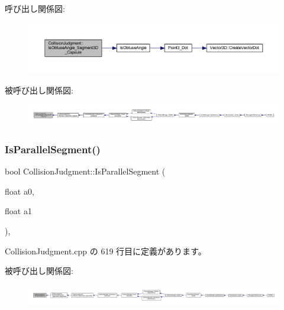 呼び出し関係図\+:\nopagebreak
\begin{figure}[H]
\begin{center}
\leavevmode
\includegraphics[width=350pt]{class_collision_judgment_a58785d1cd51b4d7af4c19dca42d842e5_cgraph}
\end{center}
\end{figure}
被呼び出し関係図\+:
\nopagebreak
\begin{figure}[H]
\begin{center}
\leavevmode
\includegraphics[width=350pt]{class_collision_judgment_a58785d1cd51b4d7af4c19dca42d842e5_icgraph}
\end{center}
\end{figure}
\mbox{\label{class_collision_judgment_a5176f1eb6b0a2fd70efc0c08054064d0}} 
\subsubsection{\texorpdfstring{Is\+Parallel\+Segment()}{IsParallelSegment()}}
{\footnotesize\ttfamily bool Collision\+Judgment\+::\+Is\+Parallel\+Segment (\begin{DoxyParamCaption}\item[{float}]{a0,  }\item[{float}]{a1 }\end{DoxyParamCaption})\hspace{0.3cm}{\ttfamily [static]}, {\ttfamily [private]}}



 Collision\+Judgment.\+cpp の 619 行目に定義があります。

被呼び出し関係図\+:
\nopagebreak
\begin{figure}[H]
\begin{center}
\leavevmode
\includegraphics[width=350pt]{class_collision_judgment_a5176f1eb6b0a2fd70efc0c08054064d0_icgraph}
\end{center}
\end{figure}
\mbox{\label{class_collision_judgment_adf77fae28d72345f9fda1668a1077f0d}} 
